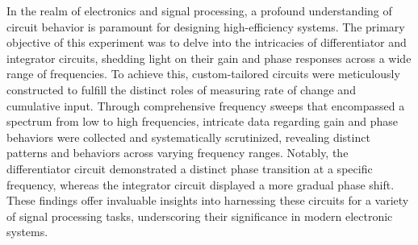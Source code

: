 \abstract
In the realm of electronics and signal processing, a profound understanding of circuit behavior is paramount for designing high-efficiency systems. 
The primary objective of this experiment was to delve into the intricacies of differentiator and integrator circuits, shedding light on their gain and phase responses across a wide range of frequencies. 
To achieve this, custom-tailored circuits were meticulously constructed to fulfill the distinct roles of measuring rate of change and cumulative input. 
Through comprehensive frequency sweeps that encompassed a spectrum from low to high frequencies, intricate data regarding gain and phase behaviors were collected and systematically scrutinized, 
revealing distinct patterns and behaviors across varying frequency ranges. 
Notably, the differentiator circuit demonstrated a distinct phase transition at a specific frequency, whereas the integrator circuit displayed a more gradual phase shift. \\	
These findings offer invaluable insights into harnessing these circuits for a variety of signal processing tasks, underscoring their significance in modern electronic systems.
